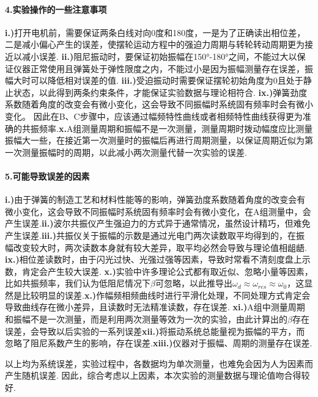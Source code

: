 \documentclass[UTF8]{ctexart}
\begin{document}
\paragraph{4.\quad 实验操作的一些注意事项}\quad\par
\textbf{i.)}打开电机前，需要保证两条白线对向0度和180度，一是为了正确读出相位差，二是减小偏心产生的误差，使摆轮运动方程中的强迫力周期与转轮转动周期更为接近以减小误差. \quad\textbf{ii.)}阻尼振动时，要保证初始振幅在150°-180°之间，不能过大以保证仪器正常使用且弹簧处于弹性限度之内，不能过小是因为振幅测量存在误差，振幅大时可以降低相对误差的值. \quad\textbf{iii.)}受迫振动时需要保证摆轮初始角度为0且处于静止状态，以此得到两条约束条件，才能保证实验数据与理论相符合.  \quad\textbf{ix.)}弹簧劲度系数随着角度的改变会有微小变化，这会导致不同振幅时系统固有频率时会有微小变化。 因此在B、C步骤中，应该通过幅频特性曲线或者相频特性曲线获得更为准确的共振频率.\quad\textbf{x.}A组测量周期和振幅不是一次测量，测量周期时拨动幅度应比测量振幅大一些，在接近第一次测量时的振幅后再进行周期测量，以保证周期近似为第一次测量振幅时的周期，以此减小两次测量代替一次实验的误差.\par

\paragraph{5.\quad 可能导致误差的因素}\quad\par
\textbf{i.)}由于弹簧的制造工艺和材料性能等的影响，弹簧劲度系数随着角度的改变会有微小变化，这会导致不同振幅时系统固有频率时会有微小变化，在A组测量中，会产生误差.\quad\textbf{ii.)}波尔共振仪产生强迫力的方式异于通常情况，虽然设计精巧，但难免产生误差.\quad\textbf{iii.)}共振仪关于振幅的示数是通过光电门两次读数取平均得到的，在振幅改变较大时，两次读数本身就有较大差异，取平均必然会导致与理论值相龃龉. \quad\textbf{ix.)}相位差读数时，由于闪光过快、光强过强等因素，导致时常看不清刻度盘上示数，肯定会产生较大误差.  \quad\textbf{x.)}实验中许多理论公式都有取近似、忽略小量等因素，比如共振频率，我们认为低阻尼情况下$\beta$可忽略，以此推导出$\omega_d\approx\omega_{res}\approx\omega_0$，这显然是比较明显的误差.\quad\textbf{x.)}作幅频相频曲线时进行平滑化处理，不同处理方式肯定会导致曲线存在微小差异，且读数时无法精准读数，存在误差. \quad\textbf{xi.)}A组中测量周期和振幅不是一次测量，而是利用两次测量等效为一次的实验，由此计算出的$\beta$存在误差，会导致以后实验的一系列误差\quad\textbf{xii.)}将振动系统总能量视为振幅的平方，而忽略了阻尼系数产生的影响，存在误差.\quad\textbf{xiii.)}仪器对于振幅、周期的测量存在误差. \par
以上均为系统误差，实验过程中，各数据均为单次测量，也难免会因为人为因素而产生随机误差. 因此，综合考虑以上因素，本次实验的测量数据与理论值吻合得较好.
\end{document}
